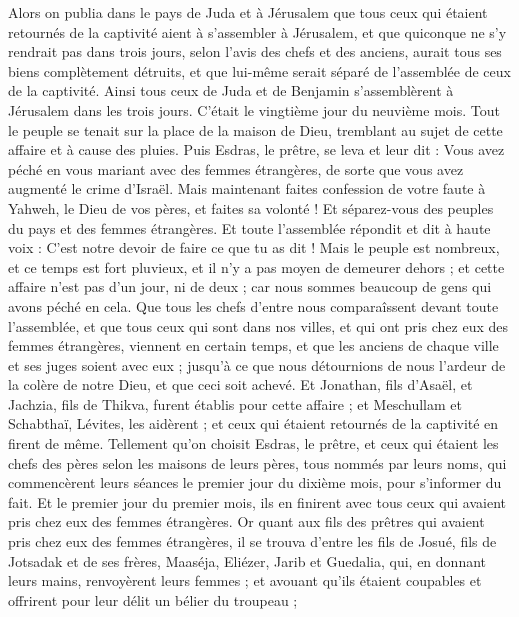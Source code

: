\begin{multicols}{2}
Alors on publia dans le pays de Juda et à Jérusalem que tous ceux qui étaient retournés de la captivité aient à s'assembler à Jérusalem,
et que quiconque ne s'y rendrait pas dans trois jours, selon l'avis des chefs et des anciens, aurait tous ses biens complètement détruits, et que lui-même serait séparé de l'assemblée de ceux de la captivité.
Ainsi tous ceux de Juda et de Benjamin s'assemblèrent à Jérusalem dans les trois jours. C'était le vingtième jour du neuvième mois. Tout le peuple se tenait sur la place de la maison de Dieu, tremblant au sujet de cette affaire et à cause des pluies.
Puis Esdras, le prêtre, se leva et leur dit : Vous avez péché en vous mariant avec des femmes étrangères, de sorte que vous avez augmenté le crime d'Israël.
Mais maintenant faites confession de votre faute à Yahweh, le Dieu de vos pères, et faites sa volonté ! Et séparez-vous des peuples du pays et des femmes étrangères.
Et toute l'assemblée répondit et dit à haute voix : C'est notre devoir de faire ce que tu as dit !
Mais le peuple est nombreux, et ce temps est fort pluvieux, et il n'y a pas moyen de demeurer dehors ; et cette affaire n'est pas d'un jour, ni de deux ; car nous sommes beaucoup de gens qui avons péché en cela.
Que tous les chefs d'entre nous comparaîssent devant toute l'assemblée, et que tous ceux qui sont dans nos villes, et qui ont pris chez eux des femmes étrangères, viennent en certain temps, et que les anciens de chaque ville et ses juges soient avec eux ; jusqu'à ce que nous détournions de nous l'ardeur de la colère de notre Dieu, et que ceci soit achevé.
Et Jonathan, fils d'Asaël, et Jachzia, fils de Thikva, furent établis pour cette affaire ; et Meschullam et Schabthaï, Lévites, les aidèrent ;
et ceux qui étaient retournés de la captivité en firent de même. Tellement qu'on choisit Esdras, le prêtre, et ceux qui étaient les chefs des pères selon les maisons de leurs pères, tous nommés par leurs noms, qui commencèrent leurs séances le premier jour du dixième mois, pour s'informer du fait.
Et le premier jour du premier mois, ils en finirent avec tous ceux qui avaient pris chez eux des femmes étrangères.
Or quant aux fils des prêtres qui avaient pris chez eux des femmes étrangères, il se trouva d'entre les fils de Josué, fils de Jotsadak et de ses frères, Maaséja, Eliézer, Jarib et Guedalia,
qui, en donnant leurs mains, renvoyèrent leurs femmes ; et avouant qu'ils étaient coupables et offrirent pour leur délit un bélier du troupeau ;

\end{multicols}
